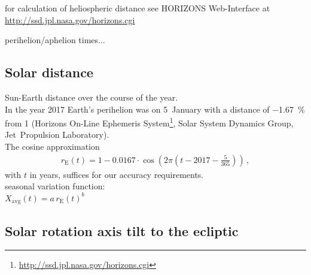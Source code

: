 for calculation of heliospheric distance see HORIZONS Web-Interface at \url{http://ssd.jpl.nasa.gov/horizons.cgi}

perihelion/aphelion times...

\subsection*{Solar distance}	%

Sun-Earth distance over the course of the year.\\
In the year 2017 Earth's perihelion was on 5~January with a distance of \SI{-1.67}{\percent} from \SI{1}{\au} (Horizons On-Line Ephemeris System\footnote{\url{http://ssd.jpl.nasa.gov/horizons.cgi}}, Solar System Dynamics Group, Jet~Propulsion Laboratory).\\
The cosine approximation
\begin{align}
	r_\text{E}(t) = 1 - 0.0167 \cdot \cos\left(2 \pi \left(t - 2017 - \frac{5}{365}\right)\right)\,,
\end{align}
with $t$ in years, suffices for our accuracy requirements.\\

seasonal variation function:\\
$X_\text{avg}(t) = a\,r_\text{E}(t)^b$\\

\subsection*{Solar rotation axis tilt to the ecliptic}

